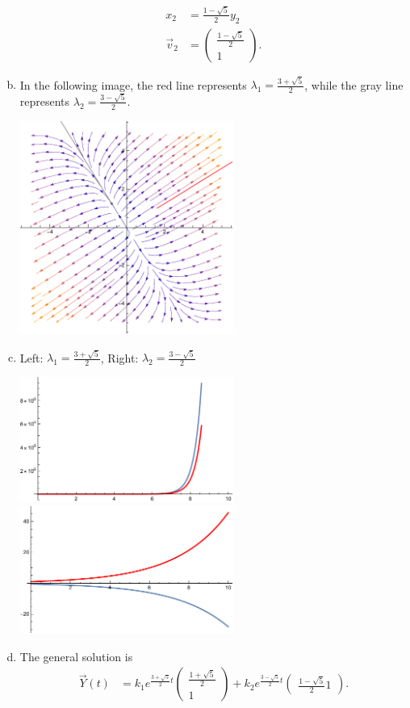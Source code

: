 \documentclass[10pt]{mypackage}
\begin{document}
\begin{enumerate}[(a)]
\begin{align*}
      x_2 &= \frac{1-\sqrt{5}}{2}y_2\\
      \vec{v}_2 &= \begin{pmatrix}\frac{1-\sqrt{5}}{2} \\ 1\end{pmatrix}.
    \end{align*}
  \item In the following image, the red line represents $\lambda_1 = \frac{3 + \sqrt{5}}{2}$, while the gray line represents $\lambda_2 = \frac{3-\sqrt{5}}{2}$.
    \begin{center}
      \includegraphics[width=7cm]{images/3_2_9c.pdf}
    \end{center}
  \item Left: $\lambda_1 = \frac{3+\sqrt{5}}{2}$, Right: $\lambda_2 = \frac{3-\sqrt{5}}{2}$
    \begin{center}
      \includegraphics[width=7cm]{images/3_2_9da.pdf} \includegraphics[width=7cm]{images/3_2_9db.pdf}
    \end{center}
  \item The general solution is
    \begin{align*}
      \vec{Y}(t) &= k_1 e^{\frac{3+\sqrt{5}}{2} t} \begin{pmatrix}\frac{1+\sqrt{5}}{2}\\1\end{pmatrix} + k_2e^{\frac{3-\sqrt{5}}{2}t } \begin{pmatrix}\frac{1-\sqrt{5}}{2} 1\end{pmatrix}.
    \end{align*}
\end{enumerate}
\end{document}
